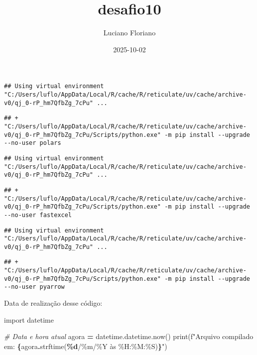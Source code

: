 \documentclass[
]{article}
\title{desafio10}
\author{Luciano Floriano}
\date{2025-10-02}
\newenvironment{Shaded}{\begin{snugshade}}{\end{snugshade}}
\newcommand{\BuiltInTok}[1]{#1}
\newcommand{\CommentTok}[1]{\textcolor[rgb]{0.56,0.35,0.01}{\textit{#1}}}
\newcommand{\ImportTok}[1]{#1}
\newcommand{\NormalTok}[1]{#1}
\newcommand{\OperatorTok}[1]{\textcolor[rgb]{0.81,0.36,0.00}{\textbf{#1}}}
\newcommand{\SpecialCharTok}[1]{\textcolor[rgb]{0.81,0.36,0.00}{\textbf{#1}}}
\newcommand{\SpecialStringTok}[1]{\textcolor[rgb]{0.31,0.60,0.02}{#1}}
\newcommand{\StringTok}[1]{\textcolor[rgb]{0.31,0.60,0.02}{#1}}
\begin{document}
\maketitle

\begin{verbatim}
## Using virtual environment "C:/Users/luflo/AppData/Local/R/cache/R/reticulate/uv/cache/archive-v0/qj_0-rP_hm7QfbZg_7cPu" ...
\end{verbatim}

\begin{verbatim}
## + "C:/Users/luflo/AppData/Local/R/cache/R/reticulate/uv/cache/archive-v0/qj_0-rP_hm7QfbZg_7cPu/Scripts/python.exe" -m pip install --upgrade --no-user polars
\end{verbatim}

\begin{verbatim}
## Using virtual environment "C:/Users/luflo/AppData/Local/R/cache/R/reticulate/uv/cache/archive-v0/qj_0-rP_hm7QfbZg_7cPu" ...
\end{verbatim}

\begin{verbatim}
## + "C:/Users/luflo/AppData/Local/R/cache/R/reticulate/uv/cache/archive-v0/qj_0-rP_hm7QfbZg_7cPu/Scripts/python.exe" -m pip install --upgrade --no-user fastexcel
\end{verbatim}

\begin{verbatim}
## Using virtual environment "C:/Users/luflo/AppData/Local/R/cache/R/reticulate/uv/cache/archive-v0/qj_0-rP_hm7QfbZg_7cPu" ...
\end{verbatim}

\begin{verbatim}
## + "C:/Users/luflo/AppData/Local/R/cache/R/reticulate/uv/cache/archive-v0/qj_0-rP_hm7QfbZg_7cPu/Scripts/python.exe" -m pip install --upgrade --no-user pyarrow
\end{verbatim}

Data de realização desse código:

\begin{Shaded}
\begin{Highlighting}[]
\ImportTok{import}\NormalTok{ datetime}

\CommentTok{\# Data e hora atual}
\NormalTok{agora }\OperatorTok{=}\NormalTok{ datetime.datetime.now()}
\BuiltInTok{print}\NormalTok{(}\SpecialStringTok{f"Arquivo compilado em: }\SpecialCharTok{\{}\NormalTok{agora}\SpecialCharTok{.}\NormalTok{strftime(}\StringTok{\textquotesingle{}}\SpecialCharTok{\%d}\StringTok{/\%m/\%Y às \%H:\%M:\%S\textquotesingle{}}\NormalTok{)}\SpecialCharTok{\}}\SpecialStringTok{"}\NormalTok{)}
\end{Highlighting}
\end{Shaded}
\end{document}
